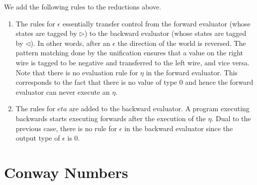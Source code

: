 \documentclass[authoryear,preprint]{sigplanconf}
\begin{document}
We add the following rules to the reductions above. 
\begin{enumerate}
\item The rules for $\epsilon$ essentially transfer control from the forward
  evaluator (whose states are tagged by $\triangleright$) to the backward
  evaluator (whose states are tagged by $\triangleleft$). In other words,
  after an $\epsilon$ the direction of the world is reversed. The pattern
  matching done by the unification ensures that a value on the right wire is
  tagged to be negative and transferred to the left wire, and vice versa.
  Note that there is no evaluation rule for $\eta$ in the forward
  evaluator. This corresponds to the fact that there is no value of type 0
  and hence the forward evaluator can never execute an $\eta$.

\item The rules for $eta$ are added to the backward evaluator. A program
  executing backwards starts executing forwards after the execution of the
  $\eta$. Dual to the previous case, there is no rule for $\epsilon$ in the
  backward evaluator since the output type of $\epsilon$ is 0.
\end{enumerate}

\section{Conway Numbers}
\end{document}

